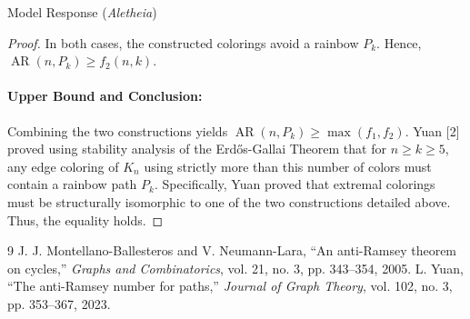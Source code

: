 \documentclass[11pt]{article}
\DeclareMathOperator{\AR}{AR}
\begin{document}
\begin{solution}{Model Response (\emph{Aletheia})}
\begin{proof}
In both cases, the constructed colorings avoid a rainbow $P_k$. Hence, $\AR(n, P_k) \ge f_2(n, k)$.

\paragraph{Upper Bound and Conclusion:}
Combining the two constructions yields $\AR(n, P_k) \ge \max(f_1, f_2)$.
Yuan [2] proved using stability analysis of the Erdős-Gallai Theorem that for $n \ge k \ge 5$, any edge coloring of $K_n$ using strictly more than this number of colors must contain a rainbow path $P_k$. Specifically, Yuan proved that extremal colorings must be structurally isomorphic to one of the two constructions detailed above.
Thus, the equality holds.
\end{proof}

\begin{thebibliography}{9}
 J. J. Montellano-Ballesteros and V. Neumann-Lara, ``An anti-Ramsey theorem on cycles,'' \textit{Graphs and Combinatorics}, vol. 21, no. 3, pp. 343--354, 2005.
 L. Yuan, ``The anti-Ramsey number for paths,'' \textit{Journal of Graph Theory}, vol. 102, no. 3, pp. 353--367, 2023.
\end{thebibliography}
\end{solution}
\end{document}
